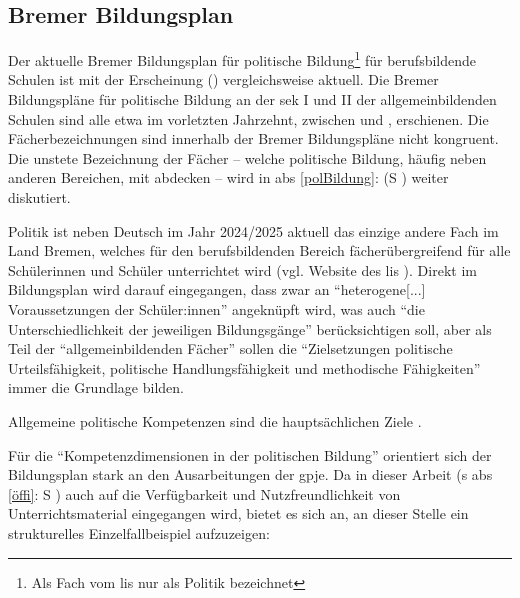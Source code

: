 \begin{quote}
    \autocite[Im Original mit anderen Hervorhebungen:][179-180]{Wehling1977}
\end{quote}



\subsection{Bremer Bildungsplan \label{bplan}} %
Der aktuelle Bremer Bildungsplan für politische Bildung\footnote{Als Fach vom \gls{lis} nur als Politik bezeichnet} für berufsbildende Schulen ist mit der Erscheinung \citeyear{bplan} (\citeauthor{bplan}) vergleichsweise aktuell. Die Bremer Bildungspläne für politische Bildung an der \gls{sek} I und II der allgemeinbildenden Schulen sind alle etwa im vorletzten Jahrzehnt, zwischen \citeyear{vogel2006gy} \autocites{vogel2006gs, vogel2006gy, lower2008} und \citeyear{vogel2010gp} \autocite{vogel2010gp}, erschienen. Die Fächerbezeichnungen sind innerhalb der Bremer Bildungspläne nicht kongruent. Die unstete Bezeichnung der Fächer -- welche politische Bildung, häufig neben anderen Bereichen, mit abdecken -- wird in \gls{abs} \ref{polBildung}: (\gls{S} \pageref{polBildung}) weiter diskutiert.

Politik ist neben Deutsch im Jahr 2024/2025 aktuell das einzige andere Fach im Land Bremen, welches für den berufsbildenden Bereich fächerübergreifend für alle Schülerinnen und Schüler unterrichtet wird (vgl. Website des \gls{lis} \citeyear{LisBildungspläne}). Direkt im Bildungsplan \autocite[][4]{bplan} wird darauf eingegangen, dass zwar an \enquote{heterogene[...] Voraussetzungen der Schüler:innen} angeknüpft wird, was auch \enquote{die Unterschiedlichkeit der jeweiligen Bildungsgänge} berücksichtigen soll, aber als Teil der \enquote{allgemeinbildenden Fächer} sollen die \enquote{Zielsetzungen politische Urteilsfähigkeit, politische Handlungsfähigkeit und methodische Fähigkeiten} immer die Grundlage bilden. 


Allgemeine politische Kompetenzen sind die hauptsächlichen Ziele \autocite[9-13]{bplan}.

Für die \enquote{Kompetenzdimensionen in der politischen Bildung} orientiert sich der Bildungsplan stark an den Ausarbeitungen der \gls{gpje}.
Da in dieser Arbeit (\gls{s} \gls{abs} \ref{öffi}: \gls{S} \pageref{öffi}) auch auf die Verfügbarkeit und Nutzfreundlichkeit von Unterrichtsmaterial eingegangen wird, bietet es sich an, an dieser Stelle ein strukturelles Einzelfallbeispiel aufzuzeigen:

